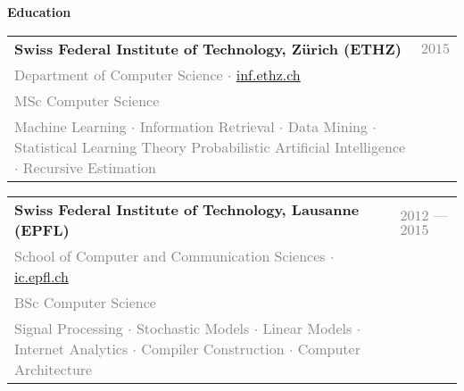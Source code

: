 \documentclass[10pt, a4paper]{article}
\begin{document}
\noindent{}
\begin{trivlist}
\item \textcolor{Mahogany}{{\textbf{\Large Education}}}
    \noindent{}
    \begin{trivlist}
    \item \begin{tabular}{p{} p{}}
                \textbf{Swiss Federal Institute of Technology, Z\"urich (ETHZ)} & \textcolor{Gray}{$2015$} \\
                \textcolor{Gray}{Department of Computer Science $\cdot$ \url{inf.ethz.ch}} & \\
                \textcolor{Gray}{MSc Computer Science} & \\
                \textcolor{Gray}{{\tiny Machine Learning $\cdot$ Information Retrieval
                $\cdot$ Data Mining $\cdot$ Statistical Learning Theory}} \newline
                \textcolor{Gray}{{\tiny Probabilistic Artificial Intelligence $\cdot$ Recursive Estimation}} & \\
            \end{tabular}
        \item \begin{tabular}{p{} p{}}
                \textbf{Swiss Federal Institute of Technology, Lausanne (EPFL)} & \textcolor{Gray}{$2012$ --- $2015$} \\
                \textcolor{Gray}{School of Computer and Communication Sciences $\cdot$ \url{ic.epfl.ch}} & \\
                \textcolor{Gray}{BSc Computer Science} & \\
                \textcolor{Gray}{\tiny Signal Processing $\cdot$ Stochastic Models $\cdot$ Linear Models $\cdot$
                Internet Analytics $\cdot$ Compiler Construction $\cdot$ Computer Architecture}
            \end{tabular}
    \end{trivlist}


\end{trivlist}
\end{document}
